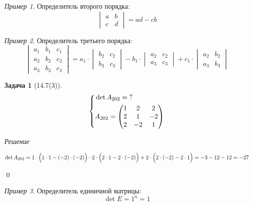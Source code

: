 \documentclass[a4paper,12pt]{article}
\newtheorem*{problem}{Задача}
\theoremstyle{definition}
\theoremstyle{remark}
\newtheorem*{example}{Пример}
\theoremstyle{remark}
\begin{document}
  \begin{example}
    Определитель второго порядка:
    \[
      \begin{vmatrix}
        a & b\\
        c & d
      \end{vmatrix} = ad - cb
    \]
  \end{example}

  \begin{example}
    Определитель третьего порядка:
    \[
      \begin{vmatrix}
        a_1 & b_1 & c_1\\
        a_2 & b_2 & c_2\\
        a_3 & b_3 & c_3
      \end{vmatrix} =
        a_1 \cdot \begin{vmatrix}b_2 & c_2\\b_3 & c_3\end{vmatrix}
        - b_1 \cdot \begin{vmatrix}a_2 & c_2\\a_3 & c_3\end{vmatrix}
        + c_1 \cdot \begin{vmatrix}a_2 & b_2\\a_3 & b_3\end{vmatrix}
    \]
  \end{example}
  
  \begin{problem}[14.7(3)]
    \[
      \left\{
        \begin{aligned}
          &\det A_{202} = \operatorname{?}\\
          &A_{202} = \begin{pmatrix}
            1 & 2 & 2\\
            2 & 1 & -2\\
            2 & -2 & 1
          \end{pmatrix}
        \end{aligned}
      \right.
    \]
  \end{problem}
  
  \emph{Решение}
  
  \[
    \det A_{202}
    = 1 \cdot \Bigl(1 \cdot 1 - (-2) \cdot (-2)\Bigr)
      \textcolor{cyanL}{-} 2 \cdot \Bigl(2 \cdot 1 - 2 \cdot (-2)\Bigr)
      + 2 \cdot \Bigl(2 \cdot (-2) - 2 \cdot 1\Bigr)
    = -3 - 12 - 12
    = -27
  \]
  
  \qed
  
  \begin{example}
    Определитель единичной матрицы:
    \[
      \det E = 1^n = 1
    \]
  \end{example}
\end{document}
